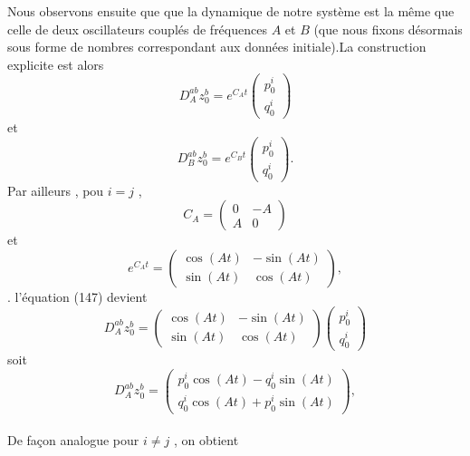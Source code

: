 \documentclass[12pt,a4paper, openany]{article}
\begin{document}
	  
	Nous observons ensuite que que la dynamique de notre système est la m\^{e}me que celle de deux oscillateurs couplés  de fréquences $A$ et $B$ (que nous fixons désormais sous forme de nombres correspondant aux données initiale).La construction explicite est alors 
	\begin{equation}
	D^{ab}_A z_0^b=e^{C_{A}t}
	\begin{pmatrix}
		p^i_0 \\
		q^i_0
	\end{pmatrix}	
	\end{equation}
	et 
	\begin{equation}
	D^{ab}_B z_0^b=e^{C_{B}t}
	\begin{pmatrix}
		p^i_0 \\
		q^i_0
	\end{pmatrix} .
	\end{equation}
	Par ailleurs , pou $i=j$ , 
	\begin{equation}
	C_{A}=
	\begin{pmatrix}
		0 & -A\\
		A & 0
	\end{pmatrix}	
	\end{equation}
	et 
	\begin{equation}
	e^{C_{A}t}=
	\begin{pmatrix}
		\cos(At) & -\sin(At) \\
		\sin(At) & \cos(At)
	\end{pmatrix}  ,	
	\end{equation} .
	l'équation (147) devient 
	\begin{equation*}
		D^{ab}_A z_0^b=
	\begin{pmatrix}
		\cos(At) & -\sin(At) \\
		\sin(At) & \cos(At)
	\end{pmatrix}  	
	\begin{pmatrix}
		p^i_0 \\
		q^i_0
	\end{pmatrix}	
	\end{equation*}
	soit
\begin{equation}
	D^{ab}_A z_0^b=
	\begin{pmatrix}
		p_0^i \cos\left(At\right)-q_0^i \sin\left(At\right)\\
		q_0^i \cos\left(At\right)+p_0^i \sin\left(At\right)
	\end{pmatrix},	
\end{equation}
\\
De façon analogue pour $i\neq j$ , on obtient   
	
\end{document}
